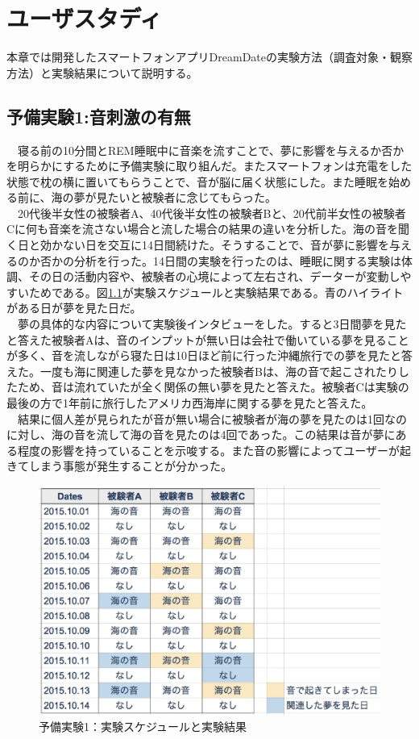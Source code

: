\chapter{ユーザスタディ}
\label{chap:visualize}

本章では開発したスマートフォンアプリDreamDateの実験方法（調査対象・観察方法）と実験結果について説明する。

\section{予備実験1:音刺激の有無}
　寝る前の10分間とREM睡眠中に音楽を流すことで、夢に影響を与えるか否かを明らかにするために予備実験に取り組んだ。またスマートフォンは充電をした状態で枕の横に置いてもらうことで、音が脳に届く状態にした。また睡眠を始める前に、海の夢が見たいと被験者に念じてもらった。\\
　20代後半女性の被験者A、40代後半女性の被験者Bと、20代前半女性の被験者Cに何も音楽を流さない場合と流した場合の結果の違いを分析した。海の音を聞く日と効かない日を交互に14日間続けた。そうすることで、音が夢に影響を与えるのか否かの分析を行った。14日間の実験を行ったのは、睡眠に関する実験は体調、その日の活動内容や、被験者の心境によって左右され、データーが変動しやすいためである。図\ref{experiment1}が実験スケジュールと実験結果である。青のハイライトがある日が夢を見た日だ。\\
　夢の具体的な内容について実験後インタビューをした。すると3日間夢を見たと答えた被験者Aは、音のインプットが無い日は会社で働いている夢を見ることが多く、音を流しながら寝た日は10日ほど前に行った沖縄旅行での夢を見たと答えた。一度も海に関連した夢を見なかった被験者Bは、海の音で起こされたりしたため、音は流れていたが全く関係の無い夢を見たと答えた。被験者Cは実験の最後の方で1年前に旅行したアメリカ西海岸に関する夢を見たと答えた。\\
　結果に個人差が見られたが音が無い場合に被験者が海の夢を見たのは1回なのに対し、海の音を流して海の音を見たのは4回であった。この結果は音が夢にある程度の影響を持っていることを示唆する。また音の影響によってユーザーが起きてしまう事態が発生することが分かった。

\begin{figure}[htbp]
\begin{center}
\includegraphics[width=13cm]{eps/schedule0.eps}
\caption{予備実験1：実験スケジュールと実験結果}
\label{experiment1}
\end{center}
\end{figure}

